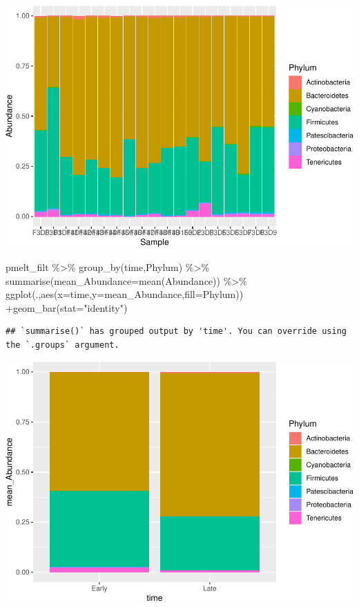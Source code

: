\documentclass[
]{book}
\newenvironment{Shaded}{\begin{snugshade}}{\end{snugshade}}
\newcommand{\AttributeTok}[1]{\textcolor[rgb]{0.77,0.63,0.00}{#1}}
\newcommand{\FunctionTok}[1]{\textcolor[rgb]{0.00,0.00,0.00}{#1}}
\newcommand{\NormalTok}[1]{#1}
\newcommand{\SpecialCharTok}[1]{\textcolor[rgb]{0.00,0.00,0.00}{#1}}
\newcommand{\StringTok}[1]{\textcolor[rgb]{0.31,0.60,0.02}{#1}}
\begin{document}
\includegraphics{16sworkshop_files/figure-latex/unnamed-chunk-2-1.pdf}

\begin{Shaded}
\begin{Highlighting}[]
\NormalTok{pmelt\_filt }\SpecialCharTok{\%\textgreater{}\%} \FunctionTok{group\_by}\NormalTok{(time,Phylum) }\SpecialCharTok{\%\textgreater{}\%} \FunctionTok{summarise}\NormalTok{(}\AttributeTok{mean\_Abundance=}\FunctionTok{mean}\NormalTok{(Abundance)) }\SpecialCharTok{\%\textgreater{}\%} \FunctionTok{ggplot}\NormalTok{(.,}\FunctionTok{aes}\NormalTok{(}\AttributeTok{x=}\NormalTok{time,}\AttributeTok{y=}\NormalTok{mean\_Abundance,}\AttributeTok{fill=}\NormalTok{Phylum)) }\SpecialCharTok{+}\FunctionTok{geom\_bar}\NormalTok{(}\AttributeTok{stat=}\StringTok{"identity"}\NormalTok{)}
\end{Highlighting}
\end{Shaded}

\begin{verbatim}
## `summarise()` has grouped output by 'time'. You can override using the `.groups` argument.
\end{verbatim}

\includegraphics{16sworkshop_files/figure-latex/unnamed-chunk-2-2.pdf}
\end{document}
